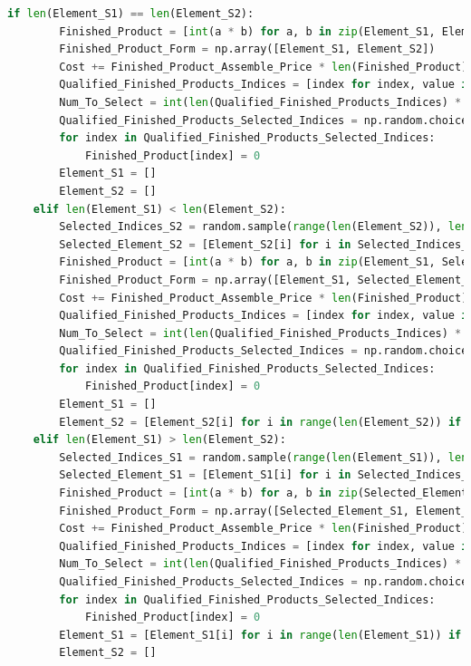 \documentclass[withoutpreface,bwprint]{cumcmthesis} %
\begin{document}
\begin{appendices}
\begin{lstlisting}[language=python]
    if len(Element_S1) == len(Element_S2):
        Finished_Product = [int(a * b) for a, b in zip(Element_S1, Element_S2)]
        Finished_Product_Form = np.array([Element_S1, Element_S2])
        Cost += Finished_Product_Assemble_Price * len(Finished_Product)
        Qualified_Finished_Products_Indices = [index for index, value in enumerate(Finished_Product) if value == 1]
        Num_To_Select = int(len(Qualified_Finished_Products_Indices) * Finished_Product_Defect_Rate)
        Qualified_Finished_Products_Selected_Indices = np.random.choice(Qualified_Finished_Products_Indices, size=Num_To_Select, replace=False)
        for index in Qualified_Finished_Products_Selected_Indices:
            Finished_Product[index] = 0
        Element_S1 = []
        Element_S2 = []
    elif len(Element_S1) < len(Element_S2):
        Selected_Indices_S2 = random.sample(range(len(Element_S2)), len(Element_S1))
        Selected_Element_S2 = [Element_S2[i] for i in Selected_Indices_S2]
        Finished_Product = [int(a * b) for a, b in zip(Element_S1, Selected_Element_S2)]
        Finished_Product_Form = np.array([Element_S1, Selected_Element_S2])
        Cost += Finished_Product_Assemble_Price * len(Finished_Product)
        Qualified_Finished_Products_Indices = [index for index, value in enumerate(Finished_Product) if value == 1]
        Num_To_Select = int(len(Qualified_Finished_Products_Indices) * Finished_Product_Defect_Rate)
        Qualified_Finished_Products_Selected_Indices = np.random.choice(Qualified_Finished_Products_Indices, size=Num_To_Select, replace=False)
        for index in Qualified_Finished_Products_Selected_Indices:
            Finished_Product[index] = 0
        Element_S1 = []
        Element_S2 = [Element_S2[i] for i in range(len(Element_S2)) if i not in Selected_Indices_S2]
    elif len(Element_S1) > len(Element_S2):
        Selected_Indices_S1 = random.sample(range(len(Element_S1)), len(Element_S2))
        Selected_Element_S1 = [Element_S1[i] for i in Selected_Indices_S1]
        Finished_Product = [int(a * b) for a, b in zip(Selected_Element_S1, Element_S2)]
        Finished_Product_Form = np.array([Selected_Element_S1, Element_S2])
        Cost += Finished_Product_Assemble_Price * len(Finished_Product)
        Qualified_Finished_Products_Indices = [index for index, value in enumerate(Finished_Product) if value == 1]
        Num_To_Select = int(len(Qualified_Finished_Products_Indices) * Finished_Product_Defect_Rate)
        Qualified_Finished_Products_Selected_Indices = np.random.choice(Qualified_Finished_Products_Indices, size=Num_To_Select, replace=False)
        for index in Qualified_Finished_Products_Selected_Indices:
            Finished_Product[index] = 0
        Element_S1 = [Element_S1[i] for i in range(len(Element_S1)) if i not in Selected_Indices_S1]
        Element_S2 = []


\end{lstlisting}
\end{appendices}
\end{document}
